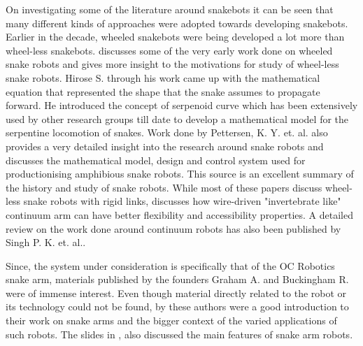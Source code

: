 \documentclass[a4paper,12pt]{report}
\begin{document}
On investigating some of the literature around snakebots it can be seen that many different kinds of approaches were adopted towards developing snakebots. Earlier in the decade, wheeled snakebots were being developed a lot more than wheel-less snakebots. \cite{saito2002modeling} discusses some of the very early work done on wheeled snake robots and gives more insight to the motivations for study of wheel-less snake robots. Hirose S. \cite{1521742} through his work came up with the mathematical equation that represented the shape that the snake assumes to propagate forward. He introduced the concept of serpenoid curve which has been extensively used by other research groups till date to develop a mathematical model for the serpentine locomotion of snakes. Work done by Pettersen, K. Y. et. al. \cite{pettersen2017snake} also provides a very detailed insight into the research around snake robots and discusses the mathematical model, design and control system used for productionising amphibious snake robots. This source is an excellent summary of the history and study of snake robots. While most of these papers discuss wheel-less snake robots with rigid links, \cite{Zhou2018AnalysisOU} discusses how wire-driven "invertebrate like" continuum arm can have better flexibility and accessibility properties. A detailed review on the work done around continuum robots has also been published by Singh P. K. et. al.\cite{singh2014continuum}.

Since, the system under consideration is specifically that of the OC Robotics snake arm, materials published by the founders Graham A. and Buckingham R. were of immense interest. Even though material directly related to the robot or its technology could not be found, \cite{RN4,RN5,RN42} by these authors were a good introduction to their work on snake arms and the bigger context of the varied applications of such robots. The slides in \cite{RN42}, also discussed the main features of  snake arm robots.
\end{document}
